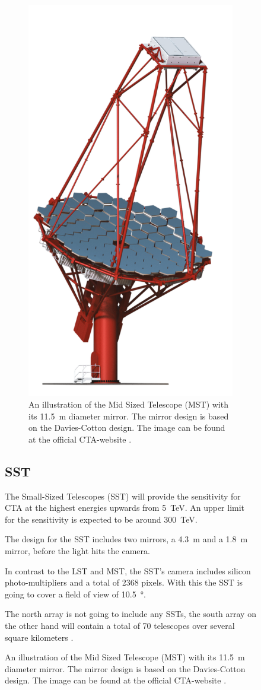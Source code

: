\begin{figure}
\begin{figure}
	\center
	\captionsetup{width=0.9\linewidth}
	\includegraphics[width=.4\textwidth]{images/MST-1.png}
	\caption{An illustration of the Mid Sized Telescope (MST) with its
	\SI{11.5}{\meter} diameter mirror.
	The mirror design is based on the Davies-Cotton design.
	The image can be found at the official CTA-website \cite{cta_web}.}
	\label{fig:mst}
\end{figure}



\subsection{SST}
The Small-Sized Telescopes (SST) will provide the sensitivity for CTA at the 
highest energies upwards from \SI{5}{\tera\electronvolt}.
An upper limit for the sensitivity is expected to be around \SI{300}{\tera\electronvolt}.

The design for the SST includes two mirrors, a \SI{4.3}{\meter} and a \SI{1.8}{\meter}
mirror, before the light hits the camera.

In contrast to the LST and MST, the SST's camera includes silicon photo-multipliers
and a total of 2368 pixels. With this the SST is going to cover a field of view 
of \SI{10.5}{\degree}.

The north array is not going to include any SSTs, the 
south array on the other hand will contain a total of 70 telescopes over
several square kilometers \cite{cta_web}.


\end{figure}
